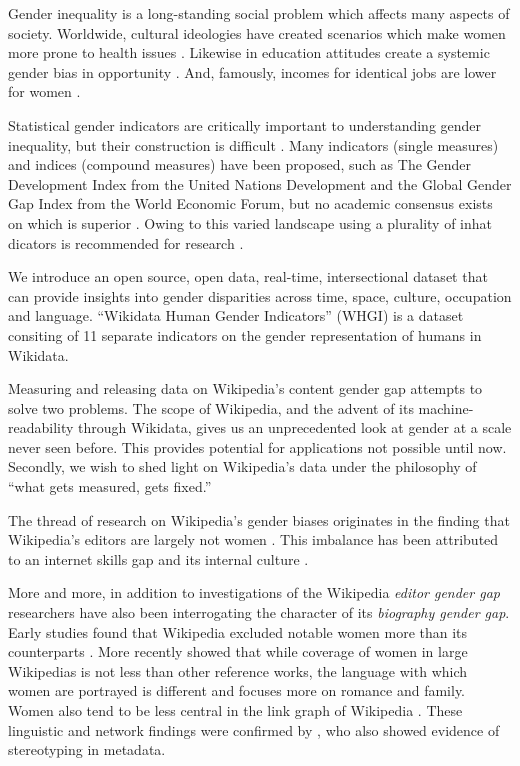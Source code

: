\documentclass{sig-alternate-05-2015}
\begin{document}
Gender inequality is a long-standing social problem which affects many aspects of society. Worldwide, cultural ideologies have created scenarios which make women more prone to health issues \cite{world_health_organization_women_2009}. Likewise in education attitudes create a systemic gender bias in opportunity \cite{heward_gender_1999}. And, famously, incomes for identical jobs are lower for women \cite{burstein_equal_????}.

Statistical gender indicators are critically important to understanding gender inequality, but their construction is difficult \cite{klasen_gender-related_2004}. Many indicators (single measures) and indices (compound measures) have been proposed, such as The Gender Development Index from the United Nations Development and the Global Gender Gap Index from the World Economic Forum, but no academic consensus exists on which is superior \cite{hawken_cross-national_2012}. Owing to this varied landscape using a plurality of inhat dicators is recommended for research \cite{jutting_measuring_2008}.

We introduce an open source, open data, real-time, intersectional dataset that can provide insights into gender disparities across time, space, culture, occupation and language. ``Wikidata Human Gender Indicators'' (WHGI) is a  dataset consiting  of 11 separate indicators on the gender representation of humans in Wikidata.

Measuring and releasing data on Wikipedia's content gender gap attempts to solve two problems. The scope of Wikipedia, and the advent of its machine-readability through Wikidata, gives us an unprecedented look at gender at a scale never seen before. This provides potential for applications not possible until now. Secondly, we wish to shed light on Wikipedia's data under the philosophy of ``what gets measured, gets fixed.''

The thread of research on Wikipedia's gender biases originates in the finding that Wikipedia's editors are largely not women \cite{hill_wikipedia_2013}. This imbalance has been attributed to an internet skills gap \cite{hargittai_mind_2015} and its internal culture \cite{lam_wp:clubhouse?:_2011}. 

More and more, in addition to investigations of the Wikipedia \textit{editor gender gap} researchers have also been interrogating the character of its \textit{biography gender gap}. Early studies found that Wikipedia excluded notable women more than its counterparts \cite{reagle_gender_2011}. More recently \cite{wagner_its_2015} showed that while coverage of women in large Wikipedias is not less than other reference works, the language with which women are portrayed is different and focuses more on romance and family. Women also tend to be less central in the link graph of Wikipedia \cite{10.1371/journal.pone.0114825}. These linguistic and network findings were confirmed by \cite{graells-garrido_first_2015}, who also showed evidence of stereotyping in metadata.
\end{document}
